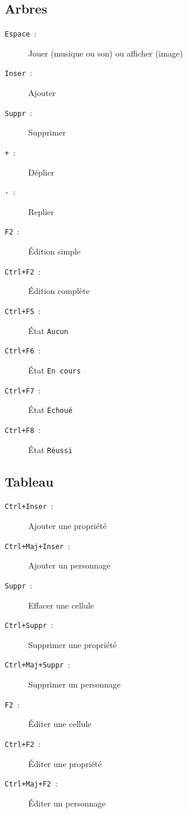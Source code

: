 \documentclass[a4paper,12pt]{article}
\newcommand*{\interfaceitem}[1]{\texttt{#1}}
\begin{document}
\subsection{Arbres}

\begin{description}
    \item[\interfaceitem{Espace}~:]{Jouer (musique ou son) ou afficher (image)}
    \item[\interfaceitem{Inser}~:]{Ajouter}
    \item[\interfaceitem{Suppr}~:]{Supprimer}
    \item[\interfaceitem{+}~:]{Déplier}
    \item[\interfaceitem{-}~:]{Replier}
    \item[\interfaceitem{F2}~:]{Édition simple}
    \item[\interfaceitem{Ctrl+F2}~:]{Édition complète}
    \item[\interfaceitem{Ctrl+F5}~:]{État \interfaceitem{Aucun}}
    \item[\interfaceitem{Ctrl+F6}~:]{État \interfaceitem{En cours}}
    \item[\interfaceitem{Ctrl+F7}~:]{État \interfaceitem{Échoué}}
    \item[\interfaceitem{Ctrl+F8}~:]{État \interfaceitem{Réussi}}
\end{description}

\subsection{Tableau}

\begin{description}
    \item[\interfaceitem{Ctrl+Inser}~:]{Ajouter une propriété}
    \item[\interfaceitem{Ctrl+Maj+Inser}~:]{Ajouter un personnage}
    \item[\interfaceitem{Suppr}~:]{Effacer une cellule}
    \item[\interfaceitem{Ctrl+Suppr}~:]{Supprimer une propriété}
    \item[\interfaceitem{Ctrl+Maj+Suppr}~:]{Supprimer un personnage}
    \item[\interfaceitem{F2}~:]{Éditer une cellule}
    \item[\interfaceitem{Ctrl+F2}~:]{Éditer une propriété}
    \item[\interfaceitem{Ctrl+Maj+F2}~:]{Éditer un personnage}
\end{description}
\end{document}
